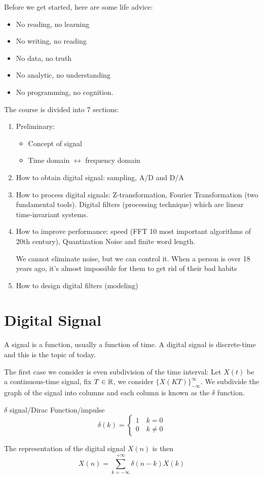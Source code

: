 \documentclass[../main.tex]{subfiles}
\begin{document}
Before we get started, here are some life advice:
\begin{itemize}
    \item No reading, no learning
    \item No writing, no reading
    \item No data, no truth
    \item No analytic, no understanding
    \item No programming, no cognition.
\end{itemize}
The course is divided into 7 sections: \begin{enumerate}
    \item Preliminary: \begin{itemize}
        \item Concept of signal
        \item Time domain $\leftrightarrow$ frequency domain
    \end{itemize}
    \item How to obtain digital signal: sampling, A/D and D/A
    \item How to process digital signals: Z-transformation, Fourier Transformation (two fundamental tools). Digital filters (processing technique) which are linear time-invariant systems.
    \item How to improve performance: speed (FFT 10 most important algorithms of 20th century), Quantization Noise and finite word length.
    \begin{remark}
        We cannot eliminate noise, but we can control it. When a person is over 18 years ago, it's almost impossible for them to get rid of their bad habits
    \end{remark}
    \item How to design digital filters (modeling)
\end{enumerate}

\chapter{Digital Signal}
A signal is a function, usually a function of time. A digital signal is discrete-time and this is the topic of today. 

The first case we consider is even subdivision of the time interval: Let $X(t)$ be a continuous-time signal, fix $T\in \mathbb{R}$, we consider $\{X(KT)\}_{-\infty}^\infty$. We subdivide the graph of the signal into columns and each column is known as the $\delta$ function.
\begin{pbox}{$\delta$ signal/Dirac Function/impulse}
    \[
    \delta(k) = \begin{cases}
        1 \quad k = 0 \\
        0 \quad k\neq 0
    \end{cases}
    \]
\end{pbox}
The representation of the digital signal $X(n)$ is then \[
X(n)= \sum_{k=-\infty}^{+\infty} \delta(n-k) X(k)
\]
\end{document}
